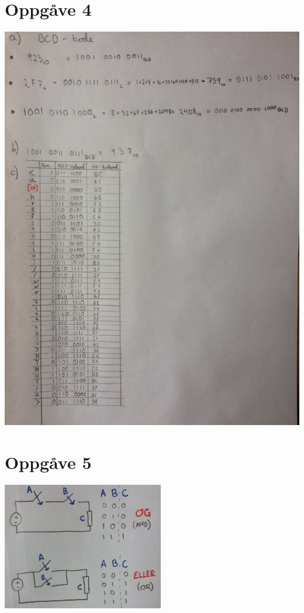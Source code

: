 \documentclass[12pt,a4paper]{article}
\begin{document}
  \section{Oppgåve 4}
    \includegraphics[width=\textwidth]{01_4.png}

  \section{Oppgåve 5}
    \includegraphics[width=200pt]{01_5.png}{\centering}
\end{document}
